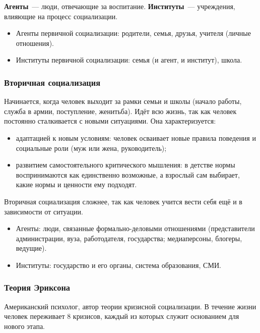 \documentclass[12pt]{article}
\begin{document}
	\begin{definition}
		\textbf{Агенты}~--- люди, отвечающие за воспитание. \textbf{Институты}~--- учреждения, влияющие на процесс социализации.
	\end{definition}

	\begin{itemize}
		\item Агенты первичной социализации: родители, семья, друзья, учителя (личные отношения).
		\item Институты первичной социализации: семья (и агент, и институт), школа.
	\end{itemize}

	\subsubsection{Вторичная социализация}

	Начинается, когда человек выходит за рамки семьи и школы (начало работы, служба в армии, поступление, женитьба). Идёт всю жизнь, так как человек постоянно сталкивается с новыми ситуациями. Она характеризуется:
	\begin{itemize}
		\item адаптацией к новым условиям: человек осваивает новые правила поведения и социальные роли (муж или жена, руководитель);
		\item развитием самостоятельного критического мышления: в детстве нормы воспринимаются как единственно возможные, а взрослый сам выбирает, какие нормы и ценности ему подходят.
	\end{itemize}

	Вторичная социализация сложнее, так как человек учится вести себя ещё и в зависимости от ситуации.
	\begin{itemize}
		\item Агенты: люди, связанные формально-деловыми отношениями (представители администрации, вуза, работодателя, государства; медиаперсоны, блогеры, ведущие).
		\item Институты: государство и его органы, система образования, СМИ.
	\end{itemize}

	\subsubsection{Теория Эриксона}

	\begin{person}
		Американский психолог, автор теории кризисной социализации. В течение жизни человек переживает $8$ кризисов, каждый из которых служит основанием для нового этапа.
	\end{person}
\end{document}
